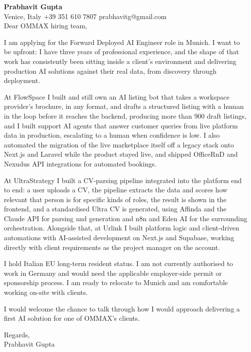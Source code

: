 \documentclass[a4paper,10.5pt]{article}
\begin{document}
\textbf{Prabhavit Gupta}\\
Venice, Italy \textbar{} +39 351 610 7807 \textbar{} prabhavitg@gmail.com\\[10pt]
Dear OMMAX hiring team,

I am applying for the Forward Deployed AI Engineer role in Munich. I want to be upfront: I have three years of professional experience, and the shape of that work has consistently been sitting inside a client's environment and delivering production AI solutions against their real data, from discovery through deployment.

At FlowSpace I built and still own an AI listing bot that takes a workspace provider's brochure, in any format, and drafts a structured listing with a human in the loop before it reaches the backend, producing more than 900 draft listings, and I built support AI agents that answer customer queries from live platform data in production, escalating to a human when confidence is low. I also automated the migration of the live marketplace itself off a legacy stack onto Next.js and Laravel while the product stayed live, and shipped OfficeRnD and Nexudus API integrations for automated bookings.

At UltraStrategy I built a CV-parsing pipeline integrated into the platform end to end: a user uploads a CV, the pipeline extracts the data and scores how relevant that person is for specific kinds of roles, the result is shown in the frontend, and a standardised Ultra CV is generated, using Affinda and the Claude API for parsing and generation and n8n and Eden AI for the surrounding orchestration. Alongside that, at Urlink I built platform logic and client-driven automations with AI-assisted development on Next.js and Supabase, working directly with client requirements as the project manager on the account.

I hold Italian EU long-term resident status. I am not currently authorised to work in Germany and would need the applicable employer-side permit or sponsorship process. I am ready to relocate to Munich and am comfortable working on-site with clients.

I would welcome the chance to talk through how I would approach delivering a first AI solution for one of OMMAX's clients.

Regards,\\
Prabhavit Gupta
\end{document}
